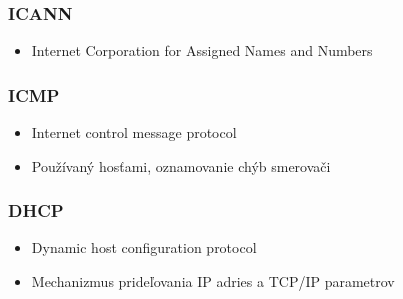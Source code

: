 \documentclass[10pt,xcolor=pdflatex,hyperref={unicode}]{beamer}
\begin{document}
    \begin{frame}
        \frametitle{ICANN}
        \begin{itemize}
            \item Internet Corporation for Assigned Names and Numbers
        \end{itemize}
    \end{frame}

    \begin{frame}
        \frametitle{ICMP}
        \begin{itemize}
            \item Internet control message protocol
            \item Používaný hosťami, oznamovanie chýb smerovači
        \end{itemize}
    \end{frame}

    \begin{frame}
        \frametitle{DHCP}
        \begin{itemize}
            \item Dynamic host configuration protocol
            \item Mechanizmus prideľovania IP adries a TCP/IP parametrov
        \end{itemize}

    \end{frame}
\end{document}
